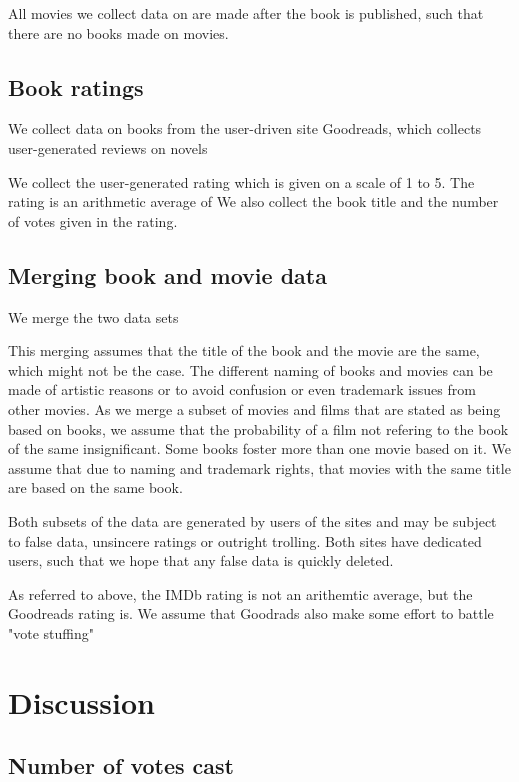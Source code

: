 \documentclass[12pt]{article}
\begin{document}
All movies we collect data on are made after the book is published, such that there are no books made on movies. 

\subsection{Book ratings} %
\label{sub:book_ratings}
We collect data on books from the user-driven site Goodreads, which collects user-generated reviews on novels

We collect the user-generated rating which is given on a scale of 1 to 5. The rating is an arithmetic average of We also collect the book title and the number of votes given in the rating. 


\subsection{Merging book and movie data}
We merge the two data sets

This merging assumes that the title of the book and the movie are the same, which might not be the case. The different naming of books and movies can be made of artistic reasons or to avoid confusion or even trademark issues from other movies. As we merge a subset of movies and films that are stated as being based on books, we assume that the probability of a film not refering to the book of the same insignificant. Some books foster more than one movie based on it. We assume that due to naming and trademark rights, that movies with the same title are based on the same book.


Both subsets of the data are generated by users of the sites and may be subject to false data, unsincere ratings or outright trolling. Both sites have dedicated users, such that we hope that any false data is quickly deleted. 

As referred to above, the IMDb rating is not an arithemtic average, but the Goodreads rating is. We assume that Goodrads also make some effort to battle "vote stuffing"

\section{Discussion} %
\label{sec:discussion}


\subsection{Number of votes cast}
\end{document}
